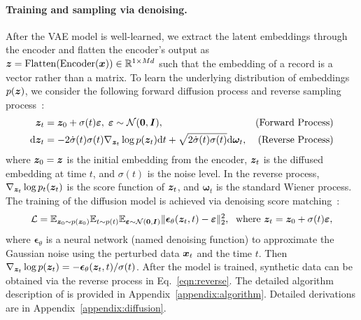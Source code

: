 \paragraph{Training and sampling via denoising.}
After the VAE model is well-learned, we extract the latent embeddings through the encoder and flatten the encoder's output as ${\bm{z}} = {\rm Flatten}({\rm Encoder} ({\bm{x}})) \in {\mathbb{R}}^{1 \times Md}$ such that the embedding of a record is a vector rather than a matrix. To learn the underlying distribution of embeddings $p({\bm{z}})$, we consider the following forward diffusion process and reverse sampling process~\citep{vp, edm}:
\begin{align}
    {\bm{z}}_t & =  {\bm{z}}_0 + \sigma(t) \bm{\varepsilon}, \; \bm{\varepsilon} \sim {\mathcal{N}}(\bm{0}, {\bm{I}}), & (\text{Forward Process})  \label{eqn:forward}\\
    {\rm d}{\bm{z}}_t & =  -2\dot{\sigma}(t) \sigma(t) \nabla_{{\bm{z}}_t} \log p({\bm{z}}_t) {\rm d}t + \sqrt{2\dot{\sigma}(t) \sigma(t)} {\rm d} \bm{\omega}_t,  & (\text{Reverse Process}) \label{eqn:reverse}
\end{align}
where ${\bm{z}}_0 = {\bm{z}}$ is the initial embedding from the encoder, ${\bm{z}}_t$ is the diffused embedding at time $t$, and $\sigma(t)$ is the noise level. In the reverse process, $\nabla_{{\bm{z}}_t} \log p_t({\bm{z}}_t)$ is the score function of ${\bm{z}}_t$, and $\bm{\omega}_t$ is the standard Wiener process. The training of the diffusion model is achieved via denoising score matching~\citep{edm}:
\begin{equation}\label{eqn:denosing}
    \mathcal{L} = {\mathbb{E}}_{{\bm{z}}_0 \sim p({\bm{z}}_0)} {\mathbb{E}}_{t \sim p(t)} {\mathbb{E}}_{\bm{\varepsilon}\sim {\mathcal{N}}(\bm{0}, {\bm{I}})} \Vert \bm{\epsilon}_{\theta}({\bm{z}}_t, t) - \bm{\varepsilon}\Vert_2^2, \;~\text{where}~ {\bm{z}}_t = {\bm{z}}_0 + \sigma(t)\bm{\varepsilon},
\end{equation}
where $\bm{\epsilon}_{\theta}$ is a neural network (named denoising function) to approximate the Gaussian noise using the perturbed data ${\bm{x}}_t$ and the time $t$. Then $\nabla_{{\bm{z}}_t} \log p({\bm{z}}_t) = - {\bm{\epsilon}_{\theta} ({\bm{z}}_t, t)}/{\sigma(t)}$. After the model is trained, synthetic data can be obtained via the reverse process in Eq.~\ref{eqn:reverse}. The detailed algorithm description of \modelname is provided in Appendix~\ref{appendix:algorithm}. Detailed derivations are in Appendix~\ref{appendix:diffusion}.

